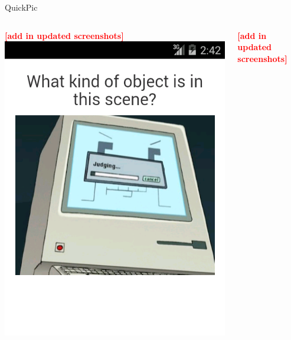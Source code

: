 \documentclass[aspectratio=169]{beamer}
\newcommand{\todo}[1]{\textcolor{red}{\textbf{[#1]}}}
\begin{document}
\begin{frame}{QuickPic}
  \begin{columns}[c]
    \begin{column}{0.5\columnwidth}
      \centering
			\todo{add in updated screenshots}
      \includegraphics[width=\textwidth,height=\textheight,keepaspectratio]{ss_quickpic_image}
    \end{column}
    \begin{column}{0.5\columnwidth}
      \centering
			\todo{add in updated screenshots}

\end{column}
\end{columns}
\end{frame}
\end{document}
